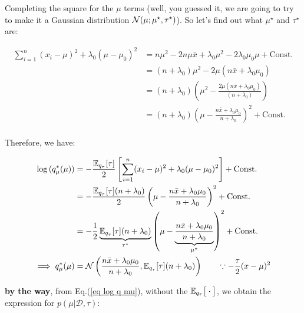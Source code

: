 \documentclass{article}
\def\C{\text{Const.}}
\begin{document}
Completing the square for the $\mu$ terms (well, you guessed it, we are going to try to make it a Gaussian distribution $\mathcal{N}(\mu; \mu^\star, \tau^\star)$). So let's find out what $\mu^\star$ and $\tau^\star$ are:


\begin{equation}\begin{split}\label{eq complete the square}
\sum_{i=1}^n (x_i - \mu)^2  +  \lambda_0 (\mu - \mu_0)^2 &= n \mu^2 - 2 n \mu \bar{x}  + \lambda_0 \mu^2 - 2 \lambda_0 \mu_0 \mu + \C \\
&= (n + \lambda_0) \mu^2 - 2 \mu (n \bar{x} + \lambda_0 \mu_0 ) \\
&=(n + \lambda_0) \left( \mu^2 - \frac{  2 \mu (n \bar{x} + \lambda_0 \mu_0)}{(n + \lambda_0) }  \right) \\
&= (n + \lambda_0) \left( \mu - \frac{n \bar{x} + \lambda_0 \mu_0}{n + \lambda_0}  \right)^2 + \C \\
\end{split}\end{equation}

Therefore, we have:

\begin{equation}\begin{split}
    \log{ ( q_\mu^*(\mu)) } &= -  \frac{\E_{q_\tau }[ \tau] }{2}    \left[  \sum_{i=1}^n (x_i - \mu)^2  +  \lambda_0 (\mu - \mu_0)^2  \right] + \C \\
&= -  \frac{\E_{q_\tau }[ \tau] (n + \lambda_0) }{2}    \left( \mu - \frac{n \bar{x} + \lambda_0 \mu_0}{n + \lambda_0}  \right)^2 + \C \\
&= - \frac{1}{2} \underbrace{\E_{q_\tau }[ \tau] (n + \lambda_0)}_{\tau^\star}    \left( \mu - \underbrace{\frac{n \bar{x} + \lambda_0 \mu_0}{n + \lambda_0}}_{\mu^\star}  \right)^2 + \C \\
\implies  q_\mu^*(\mu) &= \N\left( \frac{n \bar{x} + \lambda_0 \mu_0}{n + \lambda_0 } , \E_{q_\tau }[ \tau] (n + \lambda_0) \right)\quad\quad \because -\frac{\tau}{2} (x - \mu)^2\\
\end{split}\end{equation}

{\bf by the way}, from Eq.(\ref{eq log q mu}), without the $ \mathbb{E}_{q_\tau} \big[ \cdot \big]$, we obtain the expression for $p(\mu | \mathcal{D}, \tau)$:
\end{document}
